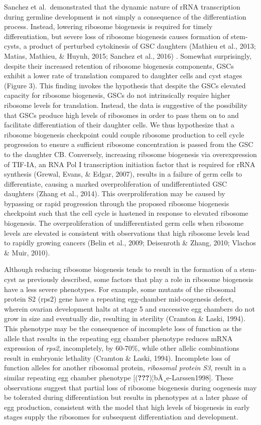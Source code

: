 \documentclass[12pt,oneside]{reedthesis}
\begin{document}
Sanchez et al.~demonstrated that the dynamic nature of rRNA
transcription during germline development is not simply a consequence of
the differentiation process. Instead, lowering ribosome biogenesis is
required for timely differentiation, but severe loss of ribosome
biogenesis causes formation of stem-cysts, a product of perturbed
cytokinesis of GSC daughters (Mathieu et al., 2013; Matias, Mathieu, \& Huynh, 2015; Sanchez et al., 2016) . Somewhat surprisingly, despite their increased
retention of ribosome biogenesis components, GSCs exhibit a lower rate
of translation compared to daughter cells and cyst stages (Figure 3).
This finding invokes the hypothesis that despite the GSCs elevated
capacity for ribosome biogenesis, GSCs do not intrinsically require
higher ribosome levels for translation. Instead, the data is suggestive
of the possibility that GSCs produce high levels of ribosomes in order
to pass them on to and facilitate differentiation of their daughter
cells. We thus hypothesize that a ribosome biogenesis checkpoint could
couple ribosome production to cell cycle progression to ensure a
sufficient ribosome concentration is passed from the GSC to the daughter
CB. Conversely, increasing ribosome biogenesis via overexpression of
TIF-IA, an RNA Pol I transcription initiation factor that is required
for rRNA synthesis (Grewal, Evans, \& Edgar, 2007), results in a failure of germ cells
to differentiate, causing a marked overproliferation of undifferentiated
GSC daughters (Zhang et al., 2014). This overproliferation may be caused by
bypassing or rapid progression through the proposed ribosome biogenesis
checkpoint such that the cell cycle is hastened in response to elevated
ribosome biogenesis. The overproliferation of undifferentiated germ
cells when ribosome levels are elevated is consistent with observations
that high ribosome levels lead to rapidly growing cancers
(Belin et al., 2009; Deisenroth \& Zhang, 2010; Vlachos \& Muir, 2010).

Although reducing ribosome biogenesis tends to result in the formation
of a stem-cyst as previously described, some factors that play a role in
ribosome biogenesis have a less severe phenotypes. For example, some
mutants of the ribosomal protein S2 (rps2) gene have a repeating
egg-chamber mid-oogenesis defect, wherein ovarian development halts at
stage 5 and successive egg chambers do not grow in size and eventually
die, resulting in sterility (Cramton \& Laski, 1994). This phenotype may be
the consequence of incomplete loss of function as the allele that
results in the repeating egg chamber phenotype reduces mRNA expression
of \emph{rps2}, incompletely, by 60-70\%, while other allelic combinations
result in embryonic lethality (Cramton \& Laski, 1994). Incomplete loss of
function alleles for another ribosomal protein, \emph{ribosomal protein S3},
result in a similar repeating egg chamber phenotype
{[}({\textbf{???}})¦bÃ¸e-Larssen1998{]}. These observations suggest that partial loss of
ribosome biogenesis during oogenesis may be tolerated during
differentiation but results in phenotypes at a later phase of egg
production, consistent with the model that high levels of biogenesis in
early stages supply the ribosomes for subsequent differentiation and
development.
\end{document}
